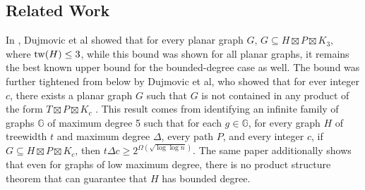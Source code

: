 \documentclass[../main.tex]{subfiles}
\begin{document}
	\subsection{Related Work}
	In \cite{DJMMUW20}, Dujmovic et al showed that for every planar graph $G$, $G\subseteq H\boxtimes P\boxtimes K_3$, where $\operatorname{tw}(H) \le 3$, while this bound was shown for all planar graphs, it remains the best known upper bound for the bounded-degree case as well. The bound was further tightened from below by Dujmovic et al, who showed that for ever integer $c$, there exists a planar graph $G$ such that $G$ is not contained in any product of the form $T\boxtimes P\boxtimes K_c$ \cite{DJMMW24}.  
	This result comes from identifying an infinite family of graphs $\mathbb{G}$ of maximum degree 5 such that for each $g\in\mathbb{G}$, for every graph $H$ of treewidth $t$ and maximum degree $\Delta$, every path $P$, and every integer $c$, if $G\subseteq H \boxtimes P\boxtimes K_c$, then $t\Delta c\ge 2^{\Omega(\sqrt{\log\log n})}$.
	The same paper additionally shows that even for graphs of low maximum degree, there is no product structure theorem that can guarantee that $H$ has bounded degree. 
	
	
	
	
\end{document}

